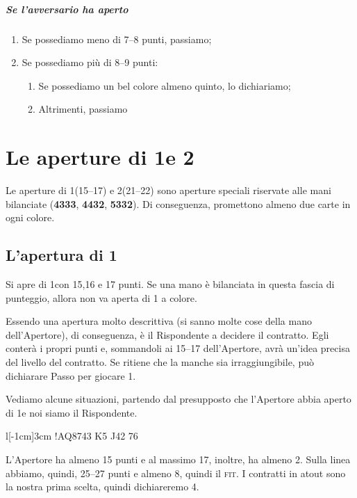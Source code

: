\documentclass[../corsofiori.tex]{subfiles}
\begin{document}
\paragraph*{Se l'avversario ha aperto}

\begin{enumerate}
    \item Se possediamo meno di 7--8 punti, passiamo;
    \item Se possediamo più di 8--9 punti:
        \begin{enumerate}
            \item Se possediamo un bel colore almeno quinto, lo dichiariamo;
            \item Altrimenti, passiamo
        \end{enumerate}
\end{enumerate}

\chapter{Le aperture di 1\SA e 2\SA}
Le aperture di 1\SA (15--17) e 2\SA (21--22) sono aperture speciali riservate alle mani bilanciate (\textbf{4333},
\textbf{4432}, \textbf{5332}). Di conseguenza, promettono almeno due carte in ogni colore.

\section{L'apertura di 1\SA}

Si apre di 1\SA con 15,16 e 17 punti. Se una mano è bilanciata in questa fascia di punteggio, allora non va aperta di
1 a colore.

Essendo una apertura molto descrittiva (si sanno molte cose della mano dell'Apertore), di conseguenza, è il
Rispondente
a decidere il contratto. Egli conterà i propri punti e, sommandoli ai 15--17 dell'Apertore, avrà un'idea precisa del
livello del contratto. Se ritiene che la manche sia irraggiungibile, può dichiarare Passo per giocare 1\SA.

Vediamo alcune situazioni, partendo dal presupposto che l'Apertore abbia aperto di 1\SA e noi siamo il Rispondente.

\begin{wraptable}[5]{l}[-1cm]{3cm}
\hand!{AQ8743} {K5} {J42} {76}
\end{wraptable}

L'Apertore ha almeno 15 punti e al massimo 17, inoltre, ha almeno 2\Sp. Sulla linea abbiamo, quindi,
25--27 punti e almeno 8\Sp, quindi il \textsc{fit}. I contratti in atout sono la nostra prima scelta, quindi
dichiareremo 4\Sp.
\end{document}
